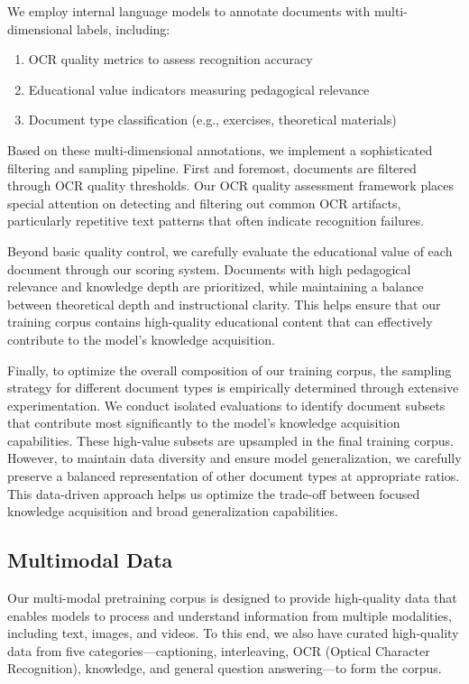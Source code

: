 \documentclass{article}
\begin{document}
We employ internal language models to annotate documents with multi-dimensional labels, including:
\begin{enumerate}
    \item OCR quality metrics to assess recognition accuracy
    \item Educational value indicators measuring pedagogical relevance
    \item Document type classification (e.g., exercises, theoretical materials)
\end{enumerate}

Based on these multi-dimensional annotations, we implement a sophisticated filtering and sampling pipeline. First and foremost, documents are filtered through OCR quality thresholds. Our OCR quality assessment framework places special attention on detecting and filtering out common OCR artifacts, particularly repetitive text patterns that often indicate recognition failures.

Beyond basic quality control, we carefully evaluate the educational value of each document through our scoring system. Documents with high pedagogical relevance and knowledge depth are prioritized, while maintaining a balance between theoretical depth and instructional clarity. This helps ensure that our training corpus contains high-quality educational content that can effectively contribute to the model's knowledge acquisition.

Finally, to optimize the overall composition of our training corpus, the sampling strategy for different document types is empirically determined through extensive experimentation. We conduct isolated evaluations to identify document subsets that contribute most significantly to the model's knowledge acquisition capabilities. These high-value subsets are upsampled in the final training corpus. However, to maintain data diversity and ensure model generalization, we carefully preserve a balanced representation of other document types at appropriate ratios. This data-driven approach helps us optimize the trade-off between focused knowledge acquisition and broad generalization capabilities.

\subsection{Multimodal Data}

Our multi-modal pretraining corpus is designed to provide high-quality data that enables models to process and understand information from multiple modalities, including text, images, and videos. 
To this end, we also have curated high-quality data from five categories—captioning, interleaving, OCR (Optical Character Recognition), knowledge, and general question answering—to form the corpus.
\end{document}
